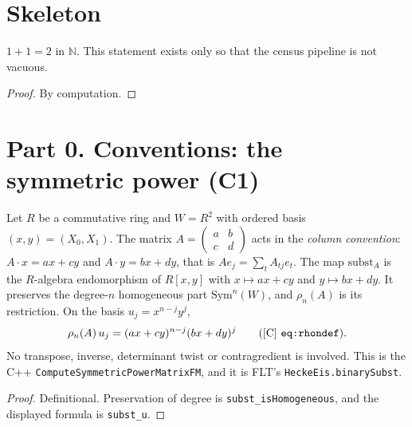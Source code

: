 
\chapter{Skeleton}

\begin{lemma}[Skeleton]\label{inf:skeleton}
  \leanok
  $1 + 1 = 2$ in $\mathbb{N}$.  This statement exists only so that the census pipeline is not vacuous.
\end{lemma}
\begin{proof}
  \leanok
  By computation.
\end{proof}

\chapter{Part 0. Conventions: the symmetric power (C1)}\label{ch:symconv}

\begin{definition}\label{conv:symconv}
  \leanok
  Let $R$ be a commutative ring and $W=R^2$ with ordered basis $(x,y)=(X_0,X_1)$. The matrix
  $A=\left(\begin{smallmatrix}a&b\\c&d\end{smallmatrix}\right)$ acts in the \emph{column convention}:
  $A\cdot x=ax+cy$ and $A\cdot y=bx+dy$, that is $A e_j=\sum_t A_{tj}e_t$. The map $\mathrm{subst}_A$ is the
  $R$-algebra endomorphism of $R[x,y]$ with $x\mapsto ax+cy$ and $y\mapsto bx+dy$. It preserves the degree-$n$
  homogeneous part $\mathrm{Sym}^n(W)$, and $\rho_n(A)$ is its restriction. On the basis $u_j=x^{n-j}y^j$,
  \[
    \rho_n(A)\,u_j=(ax+cy)^{n-j}(bx+dy)^{j}\qquad\text{([C] \texttt{eq:rhondef})}.
  \]
  No transpose, inverse, determinant twist or contragredient is involved. This is the C++
  \texttt{ComputeSymmetricPowerMatrixFM}, and it is FLT's \texttt{HeckeEis.binarySubst}.
\end{definition}
\begin{proof}
  \leanok
  Definitional. Preservation of degree is \texttt{subst\_isHomogeneous}, and the displayed formula is
  \texttt{subst\_u}.
\end{proof}

